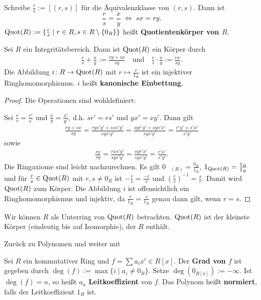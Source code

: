 Schreibe $\frac{r}{s} := [(r,s)]$ für die Äquivalenzklasse von $(r,s)$. Dann ist
\[\frac{r}{s} = \frac{x}{y} \;\Leftrightarrow\; sx = ry.\]
$\mathrm{Quot}(R) := \{\frac{r}{s} \mid r \in R, s \in R \setminus \{0_R\}\}$ heißt \textbf{Quotientenkörper von $R$}. 
\begin{satz}\label{satz5_6}
	Sei $R$ ein Integritätsbereich. Dann ist $\mathrm{Quot}(R)$ ein Körper durch
	\begin{align*}
		\frac{r}{s} + \frac{x}{y} := \frac{ry + sx}{sy}\quad\text{und}\quad \frac{r}{s} \cdot \frac{x}{y} := \frac{rx}{sy}.
	\end{align*}
	Die Abbildung $i \colon R \to \mathrm{Quot}(R)$ mit $r \mapsto \frac{r}{1_R}$ ist ein injektiver Ringhomomorphismus. $i$ heißt \textbf{kanonische Einbettung}.
\end{satz}
\begin{proof}
	Die Operationen sind wohldefiniert:
	
	Sei $\frac{r}{s} = \frac{r'}{s'}$ und $\frac{x}{y} = \frac{x'}{y'}$, d.h. $sr' = rs'$ und $yx' = xy'$. Dann gilt
	\begin{align*}
		\frac{ry + sx}{sy} = \frac{rys'y' + sxs'y'}{sys'y'} = \frac{syr'y' + sys'x'}{sys'y'} = \frac{r'y' + s'x'}{s'y'}
	\end{align*}
	sowie
	\begin{align*}
		\frac{rx}{sy} = \frac{rxs'y'}{sys'y'} = \frac{syr'x'}{sys'y'} = \frac{r'x'}{s'y'}.
	\end{align*}
	Die Ringaxiome sind leicht nachzurechnen. Es gilt $0_{\quad(R)} = \frac{0_R}{1_R}$, $1_{\mathrm{Quot}(R)} = \frac{1_R}{1_R}$ und für $\frac{r}{s} \in \mathrm{Quot}(R)$ mit $r,s \neq 0_R$ ist $-\frac{r}{s} = \frac{-r}{s}$ und $\left(\frac{r}{s}\right)^{-1} = \frac{s}{r}$. Damit wird $\mathrm{Quot}(R)$ zum Körper. Die Abbildung $i$ ist offensichtlich ein Ringhomomorphismus und injektiv, da $\frac{r}{1_R} = \frac{s}{1_R}$ genau dann gilt, wenn $r = s$.
\end{proof}
\begin{rem}\label{rem5_7}
	Wir können $R$ als Unterring von $\mathrm{Quot}(R)$ betrachten. $\mathrm{Quot}(R)$ ist der kleinste Körper (eindeutig bis auf Isomorphie), der $R$ enthält.
\end{rem}


Zurück zu Polynomen und weiter mit
\begin{definition}\label{definition5_8}
	Sei $R$ ein kommutativer Ring und $f = \sum a_i x^i \in R[x]$. Der \textbf{Grad von $f$} ist gegeben durch $\deg(f) := \max\{i \mid a_i \neq 0_R\}$. Setze $\deg(0_{R[x]}) := -\infty$. Ist $\deg(f) = n$, so heißt $a_n$ \textbf{Leitkoeffizient} von $f$. Das Polynom heißt \textbf{normiert}, falls der Leitkoeffizient $1_R$ ist.
\end{definition}

